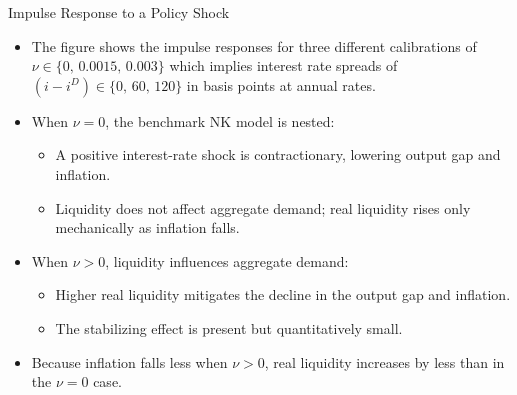 \documentclass[11pt,aspectratio=169]{beamer}
\begin{document}
\begin{frame}{Impulse Response to a Policy Shock}
\small
    \begin{itemize}
        \item The figure shows the impulse responses for three different calibrations of $\nu \in \{0,\,0.0015,\,0.003\}$ which implies interest rate spreads of $ (i - i^D) \in \{0,\,60,\,120\}$ in basis points at annual rates. 
        
  \item When $\nu = 0$, the benchmark NK model is nested:
  \begin{itemize}
    \item A positive interest-rate shock is contractionary, lowering output gap and inflation.
    \item Liquidity does not affect aggregate demand; real liquidity rises only mechanically as inflation falls.
  \end{itemize}

  \item When $\nu > 0$, liquidity influences aggregate demand:
  \begin{itemize}
    \item Higher real liquidity mitigates the decline in the output gap and inflation.
    \item The stabilizing effect is present but quantitatively small.
  \end{itemize}

  \item Because inflation falls less when $\nu > 0$, real liquidity increases by less than in the $\nu = 0$ case.
\end{itemize}


\end{frame}


\end{document}
